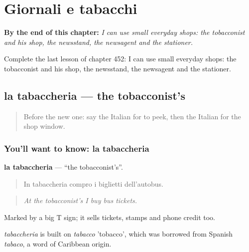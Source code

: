 
\chapter{Giornali e tabacchi}
\label{ch:it-giornali-e-tabacchi}

\begin{chapteropening}
\textbf{By the end of this chapter:} \emph{I can use small everyday shops: the tobacconist and his shop, the newsstand, the newsagent and the stationer.}

Complete the last lesson of chapter 452: I can use small everyday shops: the tobacconist and his shop, the newsstand, the newsagent and the stationer.
\end{chapteropening}

\section[la tabaccheria]{la tabaccheria — the tobacconist's}

\label{lesson:IT-C452-tabaccheria}



\begin{quote}
Before the new one: say the Italian for to peek, then the Italian for the shop window.
\end{quote}

\subsection*{You'll want to know: la tabaccheria}
\textbf{la tabaccheria} — \textquotedblleft{}the tobacconist's\textquotedblright{}.

\begin{quote}
In tabaccheria compro i biglietti dell'autobus.
\end{quote}

\begin{quote}
\emph{At the tobacconist's I buy bus tickets.}
\end{quote}

Marked by a big T sign; it sells tickets, stamps and phone credit too.

\begin{cousinweb}
\emph{tabaccheria} is built on \emph{tabacco} 'tobacco', which was borrowed from Spanish \emph{tabaco}, a word of Caribbean origin.
\end{cousinweb}

